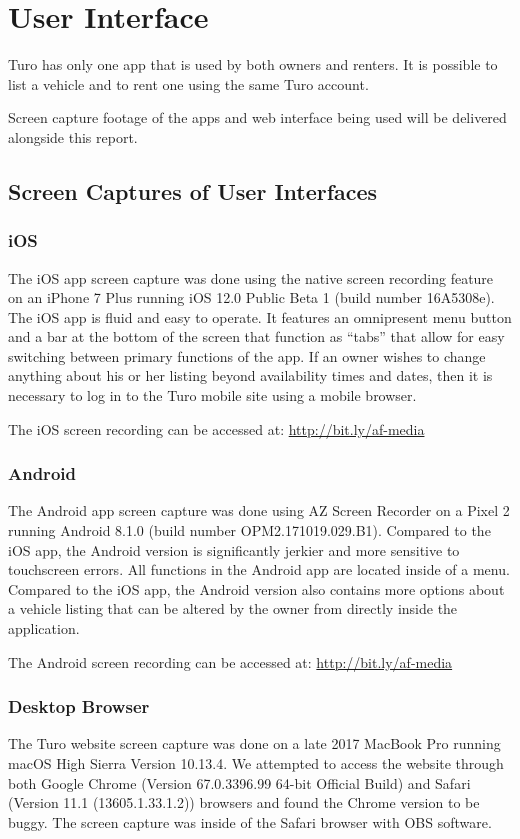 \documentclass[review,12pt]{elsarticle}
\begin{document}
\section{User Interface}
Turo has only one app that is used by both owners and renters. It is possible to list a vehicle and to rent one using the same Turo account.

Screen capture footage of the apps and web interface being used will be delivered alongside this report.

\subsection{Screen Captures of User Interfaces}
  \subsubsection{iOS}
  The iOS app screen capture was done using the native screen recording feature on an iPhone 7 Plus running iOS 12.0 Public Beta 1 (build number 16A5308e). The iOS app is fluid and easy to operate. It features an omnipresent menu button and a bar at the bottom of the screen that function as ``tabs'' that allow for easy switching between primary functions of the app. If an owner wishes to change anything about his or her listing beyond availability times and dates, then it is necessary to log in to the Turo mobile site using a mobile browser.

  The iOS screen recording can be accessed at: \url{http://bit.ly/af-media}

  \subsubsection{Android}
  The Android app screen capture was done using AZ Screen Recorder on a Pixel 2 running Android 8.1.0 (build number OPM2.171019.029.B1). Compared to the iOS app, the Android version is significantly jerkier and more sensitive to touchscreen errors. All functions in the Android app are located inside of a menu. Compared to the iOS app, the Android version also contains more options about a vehicle listing that can be altered by the owner from directly inside the application.

  The Android screen recording can be accessed at: \url{http://bit.ly/af-media}

  \subsubsection{Desktop Browser}
  The Turo website screen capture was done on a late 2017 MacBook Pro running macOS High Sierra Version 10.13.4. We attempted to access the website through both Google Chrome (Version 67.0.3396.99 64-bit Official Build) and Safari (Version 11.1 (13605.1.33.1.2)) browsers and found the Chrome version to be buggy. The screen capture was inside of the Safari browser with OBS software.
\end{document}
